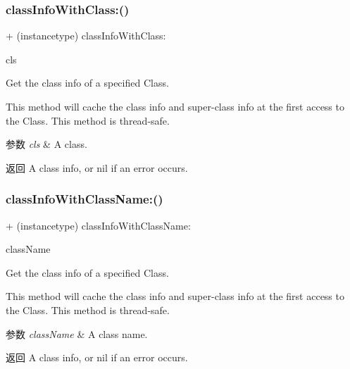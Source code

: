 \subsubsection{\texorpdfstring{class\+Info\+With\+Class\+:()}{classInfoWithClass:()}}
{\footnotesize\ttfamily + (instancetype) class\+Info\+With\+Class\+: \begin{DoxyParamCaption}\item[{(Class)}]{cls }\end{DoxyParamCaption}}

Get the class info of a specified Class.

This method will cache the class info and super-\/class info at the first access to the Class. This method is thread-\/safe.


\begin{DoxyParams}{参数}
{\em cls} & A class. \\
\hline
\end{DoxyParams}
\begin{DoxyReturn}{返回}
A class info, or nil if an error occurs. 
\end{DoxyReturn}
\mbox{\label{interface_m_a_r_class_info_af02aef4558c3d2d1060850a8564c2710}} 
\subsubsection{\texorpdfstring{class\+Info\+With\+Class\+Name\+:()}{classInfoWithClassName:()}}
{\footnotesize\ttfamily + (instancetype) class\+Info\+With\+Class\+Name\+: \begin{DoxyParamCaption}\item[{(N\+S\+String $\ast$)}]{class\+Name }\end{DoxyParamCaption}}

Get the class info of a specified Class.

This method will cache the class info and super-\/class info at the first access to the Class. This method is thread-\/safe.


\begin{DoxyParams}{参数}
{\em class\+Name} & A class name. \\
\hline
\end{DoxyParams}
\begin{DoxyReturn}{返回}
A class info, or nil if an error occurs. 
\end{DoxyReturn}
\mbox{\label{interface_m_a_r_class_info_a1a48eba29b3dbc9fde95f62721e0b26c}} 
